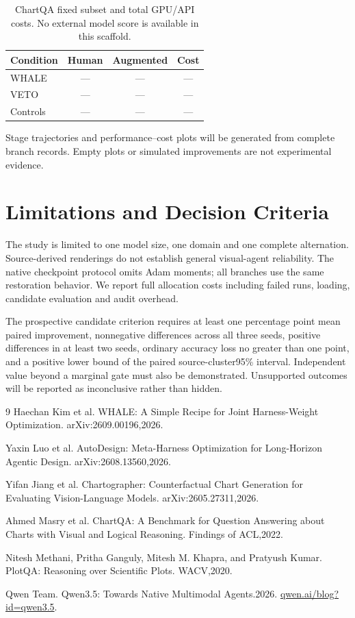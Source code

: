 \documentclass[10pt,twocolumn,letterpaper]{article}
\begin{document}
\begin{table}[t]\centering\small
\begin{tabular}{lccc}\toprule
Condition & Human & Augmented & Cost\\\midrule
WHALE & --- & --- & ---\\
VETO & --- & --- & ---\\
Controls & --- & --- & ---\\\bottomrule
\end{tabular}
\caption{ChartQA fixed subset and total GPU/API costs. No external model score
is available in this scaffold.}\label{tab:external}
\end{table}

Stage trajectories and performance--cost plots will be generated from complete
branch records. Empty plots or simulated improvements are not experimental evidence.

\section{Limitations and Decision Criteria}
The study is limited to one model size, one domain and one complete alternation.
Source-derived renderings do not establish general visual-agent reliability.
The native checkpoint protocol omits Adam moments; all branches use the same
restoration behavior. We report full allocation costs including failed runs,
loading, candidate evaluation and audit overhead.

The prospective candidate criterion requires at least one percentage point
mean paired improvement, nonnegative differences across all three seeds,
positive differences in at least two seeds, ordinary accuracy loss no greater
than one point, and a positive lower bound of the paired source-cluster95\%
interval. Independent value beyond a marginal gate must also be demonstrated.
Unsupported outcomes will be reported as inconclusive rather than hidden.

\begin{thebibliography}{9}
 Haechan Kim et al. WHALE: A Simple Recipe for Joint Harness-Weight Optimization. arXiv:2609.00196,2026.

 Yaxin Luo et al. AutoDesign: Meta-Harness Optimization for Long-Horizon Agentic Design. arXiv:2608.13560,2026.

 Yifan Jiang et al. Chartographer: Counterfactual Chart Generation for Evaluating Vision-Language Models. arXiv:2605.27311,2026.

 Ahmed Masry et al. ChartQA: A Benchmark for Question Answering about Charts with Visual and Logical Reasoning. Findings of ACL,2022.

 Nitesh Methani, Pritha Ganguly, Mitesh M. Khapra, and Pratyush Kumar. PlotQA: Reasoning over Scientific Plots. WACV,2020.

 Qwen Team. Qwen3.5: Towards Native Multimodal Agents.2026. \href{https://qwen.ai/blog?id=qwen3.5}{qwen.ai/blog?id=qwen3.5}.

\end{thebibliography}
\end{document}
